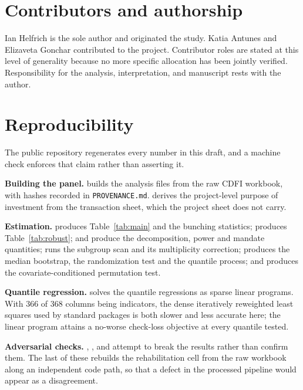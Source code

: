 
\section*{Contributors and authorship}

Ian Helfrich is the sole author and originated the study. Katia Antunes and
Elizaveta Gonchar contributed to the project. Contributor roles are stated at
this level of generality because no more specific allocation has been jointly
verified. Responsibility for the analysis, interpretation, and manuscript
rests with the author.

\appendix

\section{Reproducibility}\label{app:repro}

The public repository regenerates every number in this draft, and a
machine check enforces that claim rather than asserting it.

\textbf{Building the panel.}  builds the
analysis files from the raw CDFI workbook, with hashes recorded in
\texttt{PROVENANCE.md}.  derives the
project-level purpose of investment from the transaction sheet, which the
project sheet does not carry.

\textbf{Estimation.}  produces
Table~\ref{tab:main} and the bunching statistics;
 produces Table~\ref{tab:robust};
 and 
produce the decomposition, power and mandate quantities;
 runs the subgroup scan and its
multiplicity correction;  produces
the median bootstrap, the randomization test and the quantile process; and
 produces the
covariate-conditioned permutation test.

\textbf{Quantile regression.}  solves the quantile
regressions as sparse linear programs. With 366 of 368 columns being
indicators, the dense iteratively reweighted least squares used by standard
packages is both slower and less accurate here; the linear program attains
a no-worse check-loss objective at every quantile tested.

\textbf{Adversarial checks.} ,
, 
and  attempt to break the results
rather than confirm them. The last of these rebuilds the rehabilitation
cell from the raw workbook along an independent code path, so that a defect
in the processed pipeline would appear as a disagreement.

